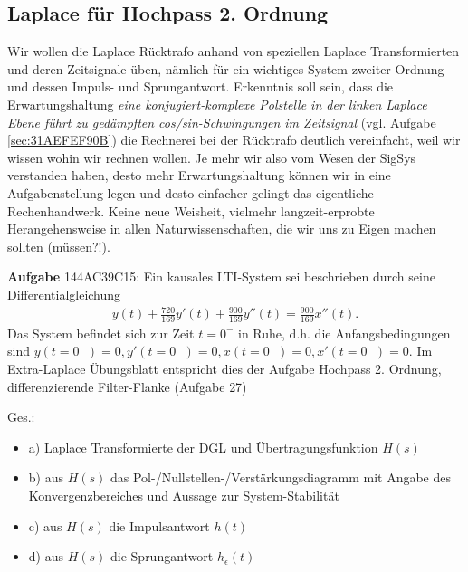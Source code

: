 \subsection{Laplace für Hochpass 2. Ordnung}
\label{sec:144AC39C15}
\begin{Ziel}
Wir wollen die Laplace Rücktrafo anhand von speziellen Laplace Transformierten und deren Zeitsignale üben, nämlich für ein wichtiges System zweiter Ordnung und dessen Impuls- und Sprungantwort. Erkenntnis soll sein, dass die Erwartungshaltung \textit{eine konjugiert-komplexe Polstelle in der linken Laplace Ebene führt zu gedämpften cos/sin-Schwingungen im Zeitsignal} (vgl. Aufgabe \ref{sec:31AEFEF90B}) die Rechnerei bei der Rücktrafo deutlich vereinfacht, weil wir wissen wohin wir rechnen wollen. Je mehr wir also vom Wesen der SigSys verstanden haben, desto mehr Erwartungshaltung können wir in eine Aufgabenstellung legen und desto einfacher gelingt das eigentliche Rechenhandwerk. Keine neue Weisheit, vielmehr langzeit-erprobte Herangehensweise in allen Naturwissenschaften, die wir uns zu Eigen machen sollten (müssen?!).
\end{Ziel}
\textbf{Aufgabe} {\tiny 144AC39C15}:
Ein kausales LTI-System sei beschrieben durch seine Differentialgleichung
\begin{align*}
y(t) + \frac{720}{169} y'(t) + \frac{900}{169} y''(t) = \frac{900}{169} x''(t).
\end{align*}
Das System befindet sich zur Zeit $t=0^{-}$ in Ruhe, d.h. die Anfangsbedingungen sind $y(t=0^{-})=0, y'(t=0^{-})=0, x(t=0^{-})=0, x'(t=0^{-})=0$. Im Extra-Laplace Übungsblatt entspricht dies der Aufgabe Hochpass 2. Ordnung, differenzierende Filter-Flanke (Aufgabe 27)

Ges.:
\begin{itemize}
\item a) Laplace Transformierte der DGL und Übertragungsfunktion $H(s)$
\item b) aus $H(s)$ das Pol-/Nullstellen-/Verstärkungsdiagramm mit Angabe des Konvergenzbereiches und Aussage zur System-Stabilität
\item c) aus $H(s)$ die Impulsantwort $h(t)$
\item d) aus $H(s)$ die Sprungantwort $h_\epsilon(t)$
\end{itemize}

